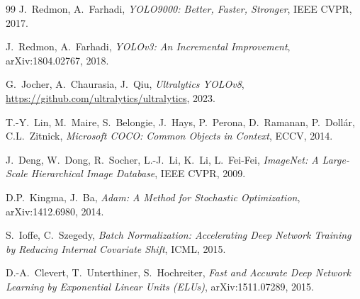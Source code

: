 \documentclass[a4paper,11pt]{article}
\begin{document}
\begin{thebibliography}{99}
J.~Redmon, A.~Farhadi,
\emph{YOLO9000: Better, Faster, Stronger},
IEEE CVPR, 2017.

J.~Redmon, A.~Farhadi,
\emph{YOLOv3: An Incremental Improvement},
arXiv:1804.02767, 2018.

G.~Jocher, A.~Chaurasia, J.~Qiu,
\emph{Ultralytics YOLOv8},
\url{https://github.com/ultralytics/ultralytics}, 2023.

T.-Y.~Lin, M.~Maire, S.~Belongie, J.~Hays, P.~Perona, D.~Ramanan, P.~Doll\'ar, C.L.~Zitnick,
\emph{Microsoft COCO: Common Objects in Context},
ECCV, 2014.

J.~Deng, W.~Dong, R.~Socher, L.-J.~Li, K.~Li, L.~Fei-Fei,
\emph{ImageNet: A Large-Scale Hierarchical Image Database},
IEEE CVPR, 2009.

D.P.~Kingma, J.~Ba,
\emph{Adam: A Method for Stochastic Optimization},
arXiv:1412.6980, 2014.

S.~Ioffe, C.~Szegedy,
\emph{Batch Normalization: Accelerating Deep Network Training by Reducing Internal Covariate Shift},
ICML, 2015.

D.-A.~Clevert, T.~Unterthiner, S.~Hochreiter,
\emph{Fast and Accurate Deep Network Learning by Exponential Linear Units (ELUs)},
arXiv:1511.07289, 2015.

\end{thebibliography}
\end{document}
